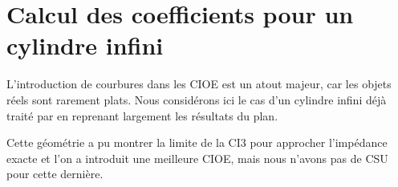 \chapter{Calcul des coefficients pour un cylindre infini}
\label{sec:cylindre}
\minitoc
\newpage
{}
L'introduction de courbures dans les CIOE est un atout majeur, car les objets réels sont rarement plats.
Nous considérons ici le cas d’un cylindre infini déjà traité par \cite{hoppe_higher_1994} en reprenant largement les résultats du plan.







Cette géométrie a pu montrer la limite de la CI3 pour approcher l'impédance exacte et l’on a introduit une meilleure CIOE, mais nous n'avons pas de CSU pour cette dernière. 
